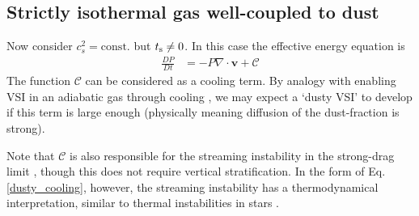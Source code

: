 \subsection{Strictly isothermal gas well-coupled to dust} 
Now consider $c_s^2=\mathrm{const.}$ but $t_\mathrm{s}\neq0$. In this case
the effective energy equation is 
\begin{align}\label{dusty_cooling}
  \frac{DP}{Dt} &= - P \nabla \cdot \bm{v} + \mathcal{C}
\end{align} 
The function $\mathcal{C}$ can be considered as a cooling term. By
analogy with enabling VSI in an adiabatic gas through cooling
\citep{nelson13,lin15}, we may expect a `dusty VSI' to develop 
if this term is large enough (physically meaning diffusion of the
dust-fraction is strong). 

Note that $\mathcal{C}$ is also responsible for the streaming
instability  in the strong-drag limit \citep{laibe14}, though this
does not require vertical stratification. In the form of
Eq. \ref{dusty_cooling}, however, the streaming instability has a
thermodynamical interpretation, similar to thermal instabilities in
stars \citep{latter06}.  
